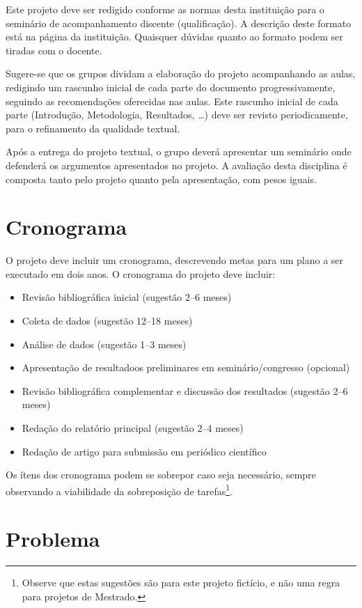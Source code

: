 \documentclass[a4paper]{article}
\begin{document}
Este projeto deve ser redigido conforme as normas desta instituição
para o seminário de acompanhamento discente (qualificação). A
descrição deste formato está na página da instituição. Quaisquer
dúvidas quanto ao formato podem ser tiradas com o docente.

Sugere-se que os grupos dividam a elaboração do projeto acompanhando
as aulas, redigindo um rascunho inicial de cada parte do documento
progressivamente, seguindo as recomendações oferecidas nas aulas. Este
rascunho inicial de cada parte (Introdução, Metodologia, Resultados,
\ldots) deve ser revisto periodicamente, para o refinamento da
qualidade textual.

Após a entrega do projeto textual, o grupo deverá apresentar um
seminário onde defenderá os argumentos apresentados no projeto. A
avaliação desta disciplina é composta tanto pelo projeto quanto pela
apresentação, com pesos iguais.

\section{Cronograma}

O projeto deve incluir um cronograma, descrevendo metas para um plano
a ser executado em dois anos. O cronograma do projeto deve incluir:

\begin{itemize}
\item Revisão bibliográfica inicial (sugestão 2--6 meses)
\item Coleta de dados (sugestão 12--18 meses)
\item Análise de dados (sugestão 1--3 meses)
\item Apresentação de resultadoos preliminares em seminário/congresso
  (opcional)
\item Revisão bibliográfica complementar e discussão dos resultados
  (sugestão 2--6 meses)
\item Redação do relatório principal (sugestão 2--4 meses)
\item Redação de artigo para submissão em periódico científico
\end{itemize}

Os ítens dos cronograma podem se sobrepor caso seja necessário, sempre
observando a viabilidade da sobreposição de tarefas\footnote{Observe
  que estas sugestões são para este projeto fictício, e não uma regra
  para projetos de Mestrado.}.

\section{Problema}
\end{document}
